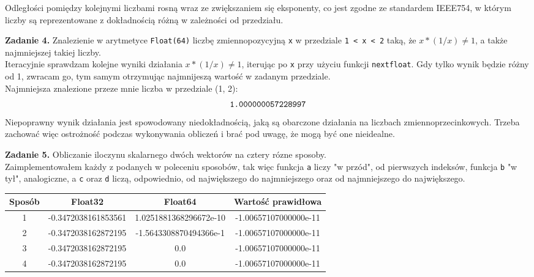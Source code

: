 \documentclass[15pt, a4paper]{article}
\begin{document}
\vspace{0.5cm}

Odległości pomiędzy kolejnymi liczbami rosną wraz ze zwiększaniem się eksponenty, co jest zgodne ze standardem IEEE754, w którym liczby są reprezentowane z dokładnością różną w zależności od przedziału.

\vspace{0.5cm}

\noindent\hrulefill


\vspace{0.5cm}

\noindent\textbf{Zadanie 4.} Znalezienie w arytmetyce \verb|Float(64)| liczbę zmiennopozycyjną \verb|x| w przedziale \verb|1 < x < 2| taką, że $x * (1/x) \neq 1$, a także najmniejszej takiej liczby.\\
Iteracyjnie sprawdzam kolejne wyniki działania $x * (1/x) \neq 1$, iterując po \verb|x| przy użyciu funkcji \verb|nextfloat|. Gdy tylko wynik będzie różny od 1, zwracam go, tym samym otrzymując najmnijeszą wartość w zadanym przedziale.\\
Najmniejsza znalezione przeze mnie liczba w przedziale (1, 2): \[\verb|1.000000057228997|\]
Niepoprawny wynik działania jest spowodowany niedokładnością, jaką są obarczone działania na liczbach zmiennoprzecinkowych. Trzeba zachować więc ostrożność podczas wykonywania obliczeń i brać pod uwagę, że mogą być one nieidealne.

\vspace{0.5cm}

\noindent\hrulefill


\vspace{0.5cm}

\noindent\textbf{Zadanie 5.} Obliczanie iloczynu skalarnego dwóch wektorów na cztery rózne sposoby.\\
Zaimplementowałem każdy z podanych w poleceniu sposobów, tak więc funkcja \verb|a| liczy "w przód", od pierwszych indeksów, funkcja \verb|b| "w tył", analogiczne, a \verb|c| oraz \verb|d| liczą, odpowiednio, od największego do najmniejszego oraz od najmniejszego do największego.

\begin{table}[ht]
    \begin{adjustbox}{max width=\textwidth}
    \begin{tabular}{|c|c|c|c|}
        \hline 
        Sposób & Float32 & Float64 & Wartość prawidłowa \\ \hline
        1 & -0.3472038161853561  & 1.0251881368296672e-10 & -1.00657107000000e-11 \\ \hline
        2 & -0.3472038162872195 & -1.5643308870494366e-1 & -1.00657107000000e-11 \\ \hline
        3 & -0.3472038162872195 & 0.0 & -1.00657107000000e-11  \\ \hline
        4 & -0.3472038162872195 & 0.0 & -1.00657107000000e-11 \\ \hline
    \end{tabular}
    \end{adjustbox}
    \label{tab:products}
\end{table}
\end{document}
